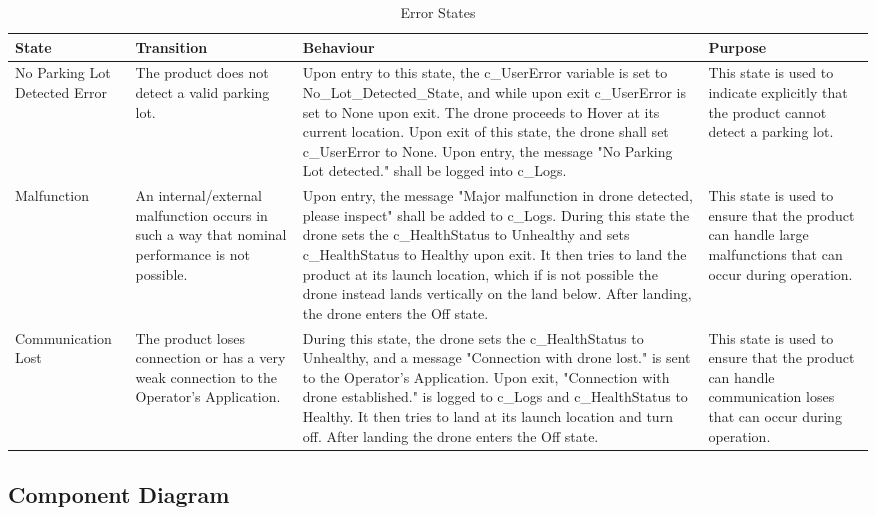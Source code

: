 \documentclass[12pt, titlepage]{article}
\begin{document}
\begin{table}[!h]
\begin{center}
\caption {Error States}
\label{ErrorStates}
\begin{tabular}{ | m{2.7cm} | m{2.3cm} | m{7.5cm} | m{2.5cm} | } 
\hline
 State & Transition & Behaviour & Purpose \\ 
\hline No Parking Lot Detected Error & 
    The product does not detect a valid parking lot. & 
    Upon entry to this state, the c\_UserError variable is set to No\_Lot\_Detected\_State, and while upon exit c\_UserError is set to None upon exit. The drone proceeds to Hover at its current location. Upon exit of this state, the drone shall set c\_UserError to None. Upon entry, the message "No Parking Lot detected." shall be logged into c_Logs. & 
    This state is used to indicate explicitly that the product cannot detect a parking lot. \\
\hline Malfunction & 
    An internal/external malfunction occurs in such a way that nominal performance is not possible. & 
    Upon entry, the message "Major malfunction in drone detected, please inspect" shall be added to c\_Logs. During this state the drone sets the c\_HealthStatus to Unhealthy and sets c\_HealthStatus to Healthy upon exit. It then tries to land the product at its launch location, which if is not possible the drone instead lands vertically on the land below. After landing, the drone enters the Off state. &
    This state is used to ensure that the product can handle large malfunctions that can occur during operation. \\
\hline Communication Lost & 
    The product loses connection or has a very weak connection to the Operator's Application. & 
    During this state, the drone sets the c\_HealthStatus to Unhealthy, and a message "Connection with drone lost." is sent to the Operator’s Application. Upon exit, "Connection with drone established." is logged to c\_Logs and c\_HealthStatus to Healthy. It then tries to land at its launch location and turn off. After landing the drone enters the Off state. &
    This state is used to ensure that the product can handle communication loses that can occur during operation. \\
\hline 
\end{tabular}
\end{center}
\end{table}

\clearpage

\subsection{Component Diagram}
\end{document}
